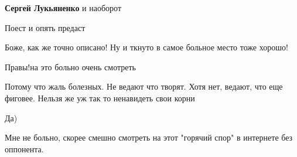 \begin{itemize}
\begin{itemize}
\textbf{Сергей Лукьяненко} и наоборот

 
Поест и опять предаст
\end{itemize}

 
Боже, как же точно описано!
Ну и ткнуто в самое больное место тоже хорошо!

 
Правы!на это больно очень смотреть

\begin{itemize}
 
Потому что жаль болезных. Не ведают что творят. Хотя нет, ведают, что еще фиговее. Нельзя же уж так то ненавидеть свои корни
\end{itemize}

 
Да)

 
Мне не больно, скорее смешно смотреть на этот "горячий спор" в интернете без оппонента.

 


\end{itemize}
